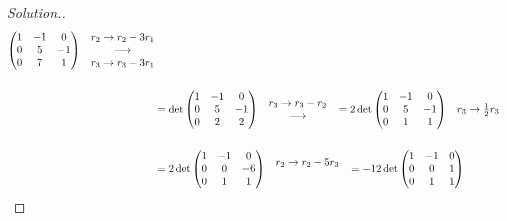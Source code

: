 \documentclass[11pt,a4paper]{article}
\theoremstyle{definition}
\newenvironment{solution}
  {\renewcommand{\qedsymbol}{}\begin{proof}[\textit{Solution}.]}
  {\end{proof}}
\begin{document}
\begin{solution}
\begin{align*}
\begin{pmatrix}
1&-1&0\\0&5&-1\\0&7&1\\
\end{pmatrix}
\hspace{0.3cm}
\begin{matrix}
r_2\rightarrow r_2-3r_1\\ \longrightarrow\\ r_3\rightarrow r_3-3r_1\\
\end{matrix}\\\\
&=\det
\begin{pmatrix}
1&-1&0\\0&5&-1\\0&2&2\\
\end{pmatrix}
\hspace{0.3cm}
\begin{matrix}
r_3\rightarrow r_3-r_2\\ \longrightarrow\\
\end{matrix}
\hspace{0.3cm}=2\det
\begin{pmatrix}
1&-1&0\\0&5&-1\\0&1&1\\
\end{pmatrix}
\hspace{0.3cm}
\begin{matrix}
r_3\rightarrow \frac{1}{2}r_3
\end{matrix}\\\\
&=2\det
\begin{pmatrix}
1&-1&0\\0&0&-6\\0&1&1\\
\end{pmatrix}
\hspace{0.3cm}
\begin{matrix}
r_2\rightarrow r_2-5r_3\\\\
\end{matrix}
\hspace{0.3cm}
=-12\det
\begin{pmatrix}
1&-1&0\\0&0&1\\0&1&1\\

\end{pmatrix}
\end{align*}
\end{solution}
\end{document}

